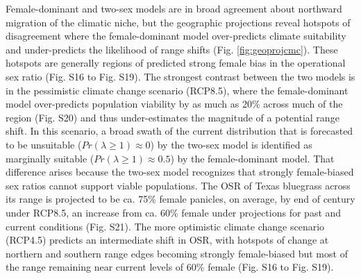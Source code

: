 \documentclass[9pt,twocolumn,twoside,lineno]{pnas-new}
\begin{document}
Female-dominant and two-sex models are in broad agreement about northward migration of the climatic niche, but the geographic projections reveal hotspots of disagreement where the female-dominant model over-predicts climate suitability and under-predicts the likelihood of range shifts (Fig. \ref{fig:geoprojcmc}). 
These hotspots are generally regions of predicted strong female bias in the operational sex ratio (Fig. S16 to Fig. S19). 
The strongest contrast between the two models is in the pessimistic climate change scenario (RCP8.5), where the female-dominant model over-predicts population viability by as much as 20\% across much of the region (Fig. S20) and thus under-estimates the magnitude of a potential range shift. 
In this scenario, a broad swath of the current distribution that is forecasted to be unsuitable ($Pr(\lambda \ge 1) \approx 0$) by the two-sex model is identified as marginally suitable ($Pr(\lambda \ge 1) \approx 0.5$) by the female-dominant model. 
That difference arises because the two-sex model recognizes that strongly female-biased sex ratios cannot support viable populations. 
The OSR of Texas bluegrass across its range is projected to be ca. 75\% female panicles, on average, by end of century under RCP8.5, an increase from ca. 60\% female under projections for past and current conditions (Fig. S21). 
The more optimistic climate change scenario (RCP4.5) predicts an intermediate shift in OSR, with hotspots of change at northern and southern range edges becoming strongly female-biased but most of the range remaining near current levels of 60\% female (Fig. S16 to Fig. S19). 
\end{document}
